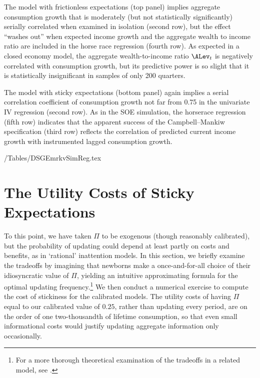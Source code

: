 \documentclass[titlepage]{\econtex}\newcommand{\texname}{cAndCwithStickyE}
\begin{document}
The model with frictionless expectations (top panel) implies aggregate consumption growth that is moderately (but not statistically significantly) serially correlated when examined in isolation (second row), but the effect ``washes out'' when expected income growth and the aggregate wealth to income ratio are included in the horse race regression (fourth row).  As expected in a closed economy model, the aggregate wealth-to-income ratio $\ALev_t$ is negatively correlated with consumption growth, but its predictive power is so slight that it is statistically insignificant in samples of only 200 quarters.

The model with sticky expectations (bottom panel) again implies a serial correlation coefficient of consumption growth not far from 0.75 in the univariate IV regression (second row).  As in the SOE simulation, the horserace regression (fifth row) indicates that the apparent success of the Campbell--Mankiw specification (third row) reflects the correlation of predicted current income growth with instrumented lagged consumption growth.

\econtexRoot/Tables/DSGEmrkvSimReg.tex



\section{The Utility Costs of Sticky Expectations}\label{sec:uCost}

To this point, we have taken $\Pi$ to be exogenous (though reasonably calibrated), but the probability of updating could depend at least partly on costs and benefits, as in `rational' inattention models.  In this section, we briefly examine the tradeoffs by imagining that newborns make a once-and-for-all choice of their idiosyncratic value of $\Pi$, yielding an intuitive approximating formula for the optimal updating frequency.\footnote{For a more thorough theoretical examination of the tradeoffs in a related model, see \cite{reis:inattentive}.}  We then conduct a numerical exercise to compute the cost of stickiness for the calibrated models.  The utility costs of having $\Pi$ equal to our calibrated value of $0.25$, rather than updating every period, are on the order of one two-thousandth of lifetime consumption, so that even small informational costs would justify updating aggregate information only occasionally.
\end{document}
